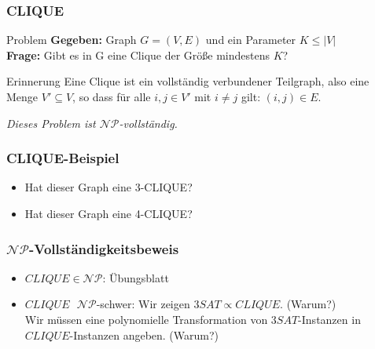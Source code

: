 \begin{frame}
\frametitle{CLIQUE}
\begin{block}{Problem}
\textbf{Gegeben:} Graph $G = (V, E)$ und ein Parameter $K \leq |V|$\\
\textbf{Frage:} Gibt es in G eine Clique der Größe mindestens $K$?
\end{block}
\begin{block}{Erinnerung}
Eine Clique ist ein vollständig verbundener Teilgraph, also eine Menge $V' \subseteq V$, so dass für alle $i,j \in V'$ mit $i\neq j$ gilt: $(i, j) \in E$.
\end{block}
\textit{Dieses Problem ist $\mathcal{NP}$-vollständig.}
\end{frame}

\begin{frame}
\frametitle{CLIQUE-Beispiel}

\begin{figure}[H]
\end{figure}
\begin{itemize}
\item Hat dieser Graph eine 3-CLIQUE?
\invincible \pause
\item Hat dieser Graph eine 4-CLIQUE?
\vincible
\end{itemize}
\end{frame}

\begin{frame}
\frametitle{$\mathcal{NP}$-Vollständigkeitsbeweis}
\begin{itemize}
 \item $CLIQUE \in \mathcal{NP}$: Übungsblatt\\
 \item $CLIQUE\mbox{ } \mathcal{NP}$-schwer: Wir zeigen $3SAT \propto CLIQUE$. (Warum?)\\\invincible\pause
 Wir müssen eine polynomielle Transformation von $3SAT$-Instanzen in $CLIQUE$-Instanzen angeben. (Warum?)\\ \vincible
\end{itemize}
\end{frame}

